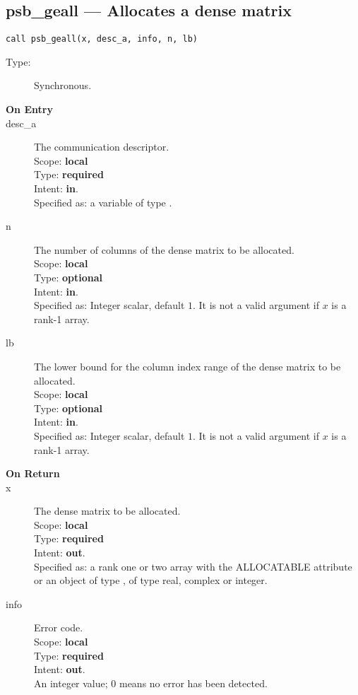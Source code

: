 %
%
\clearpage\subsection*{psb\_geall --- Allocates a dense matrix}

\begin{verbatim}
call psb_geall(x, desc_a, info, n, lb)
\end{verbatim}

\begin{description}
\item[Type:] Synchronous.
\item[\bf On Entry]
\item[desc\_a] The communication descriptor.\\
Scope: {\bf local} \\
Type: {\bf required}\\
Intent: {\bf in}.\\
Specified as: a variable of type \descdata.\\
\item[n] The number of columns of the dense matrix to be allocated.\\
Scope: {\bf local} \\
Type: {\bf optional}\\
Intent: {\bf in}.\\
Specified as: Integer scalar, default $1$. It is not a valid argument  if $x$ is a
rank-1 array. 
\item[lb] The lower bound for the column index range of the dense matrix to be allocated.\\
Scope: {\bf local} \\
Type: {\bf optional}\\
Intent: {\bf in}.\\
Specified as: Integer scalar, default $1$. It is not a valid argument if $x$ is a
rank-1 array. 
\end{description}

\begin{description}
\item[\bf On Return]
\item[x] The dense matrix to be allocated.\\
Scope: {\bf local} \\
Type: {\bf required}\\
Intent: {\bf out}.\\
Specified as: a rank one or two array with the ALLOCATABLE  attribute
or an object of type \vdata, of type real, complex or integer.\\ 
\item[info] Error code.\\
Scope: {\bf local} \\
Type: {\bf required} \\
Intent: {\bf out}.\\
An integer value; 0 means no error has been detected. 
\end{description}


